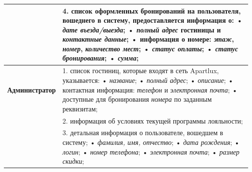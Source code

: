 \begin{longtable}{|p{0.5cm}|p{15.5cm}|}
	&
	4. список оформленных бронирований на пользователя, вошеднего в систему, предоставляется информация о: \newline
	• \textit{дате въезда/выезда}; \newline
	• \textit{полный адрес} гостиницы и \textit{контактные данные}; \newline
	• информация о номере: \textit{этаж}, \textit{номер}, \textit{количество мест}; \newline
	• \textit{статус оплаты}; \newline
	• \textit{статус бронирования}; \newline
	• \textit{сумма}; \\
	\hline
	
	\begin{rotatebox}[origin=r]{90}
		{ \textbf{Администратор}}
	\end{rotatebox} 
	& 
	1. список гостиниц, которые входят в сеть Apartlux, указывается: \newline
	• \textit{название}; \newline
	• \textit{полный адрес}; \newline
	• \textit{описание}; \newline
	• контактная информация: \textit{телефон} и \textit{электронная почта}; \newline
	• доступные для бронирования \textit{номера} по заданным реквизитам; \\
	\cline{2-2}
	
	&
	2. информация об условиях текущей программы лояльности; \\
	\cline{2-2}
	
	&
	3. детальная информация о пользователе, вошедшем в систему; \newline
	• \textit{фамилия, имя, отчество}; \newline
	• \textit{дата рождения}; \newline
	• \textit{логин}; \newline
	• \textit{номер телефона}; \newline
	• \textit{электронная почта}; \newline
	• \textit{размер скидки}; \\
	\cline{2-2}
	

\end{longtable}
